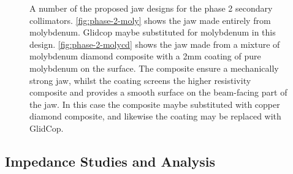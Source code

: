 \begin{figure}
\caption{A number of the proposed jaw designs for the phase 2 secondary collimators. \ref{fig:phase-2-moly} shows the jaw made entirely from molybdenum. Glidcop maybe substituted for molybdenum in this design. \ref{fig:phase-2-molycd} shows the jaw made from a mixture of molybdenum diamond composite with a 2mm coating of pure molybdenum on the surface. The composite ensure a mechanically strong jaw, whilst the coating screens the higher resistivity composite and provides a smooth surface on the beam-facing part of the jaw. In this case the composite maybe substituted with copper diamond composite, and likewise the coating may be replaced with GlidCop.}
\label{fig:phase-2-jaw-designs}
\end{figure}

\subsection{Impedance Studies and Analysis}

